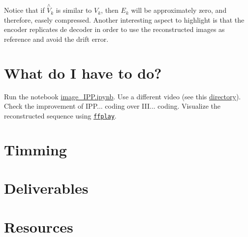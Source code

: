 Notice that if $\overset{\wedge}{{V}}_k$ is similar to $V_k$, then
$E_k$ will be approximately zero, and therefore, easely
compressed. Another interesting aspect to highlight is that the
encoder replicates de decoder in order to use the reconstructed images
as reference and avoid the drift error.

\section{What do I have to do?}

Run the notebook \href{https://github.com/Sistemas-Multimedia/MRVC/blob/master/src/image_IPP.ipynb}{image\_IPP.ipynb}. Use a different video (see
this
\href{https://github.com/Sistemas-Multimedia/MRVC/tree/master/sequences}{directory}). Check
the improvement of IPP... coding over III... coding. Visualize the
reconstructed sequence using \href{https://ffmpeg.org/ffplay.html}{\texttt{ffplay}}.

\section{Timming}

\section{Deliverables}

\section{Resources}

\renewcommand{\addcontentsline}[3]{}%

